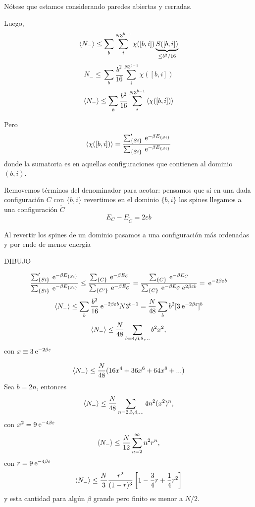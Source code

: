 \documentclass[10pt,oneside]{CBFT_book}
\begin{document}
Nótese que estamos considerando paredes abiertas y cerradas.

Luego,
\[
	\braket{N_-} \leq \sum_b \sum_i^{N3^{b-1}} \chi([b,i]) \underbrace{S([b,i])}_{\leq b^2/16}
\]
\[
	N_- \leq \sum_b \frac{b^2}{16} \sum_i^{N3^{b-1}} \chi([b,i])
\]
\[
	\braket{N_-} \leq \sum_b \frac{b^2}{16} \sum_i^{N3^{b-1}} \braket{\chi([b,i])}
\]

Pero
\[
	\braket{\chi([b,i])} = \frac{ \sum_{\{Si\}}' \:\mathrm{e}^{-\beta E_{\{Si\}}} }
	{ \sum_{\{Si\}} \:\mathrm{e}^{-\beta E_{\{Si\}}} }
\]
donde la sumatoria es en aquellas configuraciones que contienen al dominio $(b,i)$.


Removemos términos del denominador para acotar: pensamos que si en una dada configuración $C$ con $\{b,i\}$ revertimos 
en el dominio $\{b,i\}$ los spines llegamos a una configuración $\tilde{C}$
\[
	E_C - E_{\tilde{C}} = 2 \varepsilon b
\]

Al revertir los spines de un dominio pasamos a una configuración más ordenadas y por ende de menor energía
 
 DIBUJO
 
\[
	\frac{ \sum_{\{Si\}}' \:\mathrm{e}^{-\beta E_{\{Si\}}} }{ \sum_{\{Si\}} \:\mathrm{e}^{-\beta E_{\{Si\}}} }
	\leq 
	\frac{ \sum_{\{C\}} \:\mathrm{e}^{-\beta E_C} }{ \sum_{\{C'\}} \:\mathrm{e}^{-\beta E_{\tilde{C}}} } =
	\frac{ \sum_{\{C\}} \:\mathrm{e}^{-\beta E_C} }{ \sum_{\{C\}} \:\mathrm{e}^{-\beta E_{\tilde{C}}} 
	\:\mathrm{e}^{2\beta\varepsilon b} } = \:\mathrm{e}^{-2\beta \varepsilon b}
\] 
\[
	\braket{N_-} \leq \sum_b \frac{b^2}{16} \:\mathrm{e}^{-2\beta \varepsilon b} N 3^{b-1} =
	\frac{N}{48} \sum_b b^2 [ 3 \:\mathrm{e}^{-2\beta \varepsilon } ]^b
\]
\[
	\braket{N_-} \leq \frac{N}{48} \sum_{b=4,6,8,...} b^2 x^2,
\]
con $ x \equiv 3 \:\mathrm{e}^{-2\beta \varepsilon } $

\[
	\braket{N_-} \leq \frac{N}{48} (16x^4 + 36x^6 + 64x^8 + ...) 
\]
Sea $b=2n$, entonces
\[
	\braket{N_-} \leq \frac{N}{48} \sum_{n=2,3,4,...} 4 n^2 (x^2)^n,
\]
con $x^2 = 9 \:\mathrm{e}^{-4\beta\varepsilon} $
\[
	\braket{N_-} \leq \frac{N}{12} \sum_{n=2}^\infty n^2 r^n,
\]
con $r=9 \:\mathrm{e}^{-4\beta\varepsilon}$
\[
	\braket{N_-} \leq \frac{N}{3} \frac{r^2}{(1-r)^3} \left[ 1 - \frac{3}{4}r + \frac{1}{4}r^2 \right]
\]
y esta cantidad para algún $\beta$ grande pero finito es menor a $N/2$.


\end{document}
